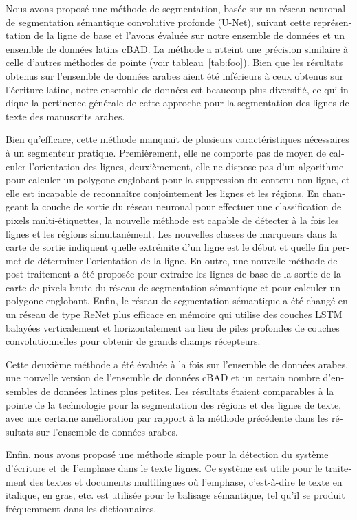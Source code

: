 \begin{french}
Nous avons proposé une méthode de segmentation, basée sur un réseau neuronal de
segmentation sémantique convolutive profonde (U-Net), suivant cette
représentation de la ligne de base et l'avons évaluée sur notre ensemble de
données et un ensemble de données latins cBAD. La méthode a atteint une
précision similaire à celle d'autres méthodes de pointe (voir
tableau~\ref{tab:foo}).   Bien que les résultats obtenus sur l'ensemble de
données arabes aient été inférieurs à ceux obtenus sur l'écriture latine, notre
ensemble de données est beaucoup plus diversifié, ce qui indique la pertinence
générale de cette approche pour la segmentation des lignes de texte des
manuscrits arabes.

Bien qu'efficace, cette méthode manquait de plusieurs caractéristiques
nécessaires à un segmenteur pratique. Premièrement, elle ne comporte pas de
moyen de calculer l'orientation des lignes, deuxièmement, elle ne dispose pas
d'un algorithme pour calculer un polygone englobant pour la suppression du
contenu non-ligne, et elle est incapable de reconnaître conjointement les
lignes et les régions. En changeant la couche de sortie du réseau neuronal pour
effectuer une classification de pixels multi-étiquettes, la nouvelle méthode
est capable de détecter à la fois les lignes et les régions simultanément. Les
nouvelles classes de marqueurs dans la carte de sortie indiquent quelle
extrémite d'un ligne est le début et quelle fin permet de déterminer
l'orientation de la ligne. En outre, une nouvelle méthode de post-traitement a
été proposée pour extraire les lignes de base de la sortie de la carte de
pixels brute du réseau de segmentation sémantique et pour calculer un polygone
englobant. Enfin, le réseau de segmentation sémantique a été changé en un
réseau de type ReNet plus efficace en mémoire qui utilise des couches LSTM
balayées verticalement et horizontalement au lieu de piles profondes de couches
convolutionnelles pour obtenir de grands champs récepteurs.

Cette deuxième méthode a été évaluée à la fois sur l'ensemble de données
arabes, une nouvelle version de l'ensemble de données cBAD et un certain nombre
d'ensembles de données latines plus petites. Les résultats étaient comparables
à la pointe de la technologie pour la segmentation des régions et des lignes de
texte, avec une certaine amélioration par rapport à la méthode précédente dans
les résultats sur l'ensemble de données arabes.

Enfin, nous avons proposé une méthode simple pour la détection du système
d'écriture et de I'emphase dans le texte lignes. Ce système est utile pour le
traitement des textes et documents multilingues où l'emphase, c'est-à-dire le
texte en italique, en gras, etc. est utilisée pour le balisage sémantique, tel
qu'il se produit fréquemment dans les dictionnaires.


\end{french}
